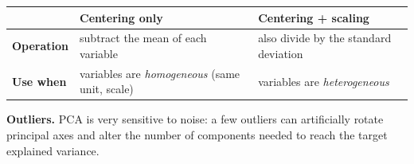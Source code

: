 \documentclass[10pt,a4paper]{article}
\begin{document}
\vspace{3pt}
\begin{center}
\small
\begin{tabular}{lll}
\toprule
\rowcolor{lightbg}
 & \textbf{Centering only} & \textbf{Centering + scaling} \\
\midrule
\textbf{Operation} & subtract the mean of each variable & also divide by the standard deviation \\
\addlinespace[3pt]
\textbf{Use when} & variables are \textit{homogeneous} (same unit, scale) & variables are \textit{heterogeneous} \\
\bottomrule
\end{tabular}
\end{center}

\vspace{3pt}
\begin{tcolorbox}[
    colframe=accentred,
    colback=white,
    arc=1.5mm,
    boxrule=0.5pt,
    left=8pt, right=8pt, top=4pt, bottom=4pt
]
\textbf{\color{accentred}Outliers.} PCA is very sensitive to noise: a few outliers can artificially rotate principal axes and alter the number of components needed to reach the target explained variance.
\end{tcolorbox}

\end{document}
